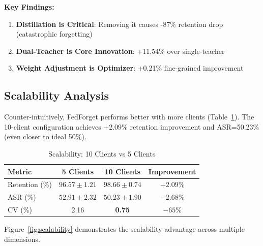 \documentclass[10pt,twocolumn]{article}
\begin{document}
\textbf{Key Findings:}

\begin{enumerate}
\item \textbf{Distillation is Critical}: Removing it causes -87\% retention drop (catastrophic forgetting)
\item \textbf{Dual-Teacher is Core Innovation}: +11.54\% over single-teacher
\item \textbf{Weight Adjustment is Optimizer}: +0.21\% fine-grained improvement
\end{enumerate}

\subsection{Scalability Analysis}

Counter-intuitively, FedForget performs better with more clients (Table~\ref{tab:scalability}). The 10-client configuration achieves +2.09\% retention improvement and ASR=50.23\% (even closer to ideal 50\%).

\begin{table}[t]
\centering
\caption{Scalability: 10 Clients vs 5 Clients}
\label{tab:scalability}
\begin{tabular}{lccc}
\toprule
Metric & 5 Clients & 10 Clients & Improvement \\
\midrule
Retention (\%) & $96.57 \pm 1.21$ & $\mathbf{98.66 \pm 0.74}$ & $+2.09$\% \\
ASR (\%) & $52.91 \pm 2.32$ & $\mathbf{50.23 \pm 1.90}$ & $-2.68$\% \\
CV (\%) & 2.16 & \textbf{0.75} & $-65$\% \\
\bottomrule
\end{tabular}
\end{table}

Figure~\ref{fig:scalability} demonstrates the scalability advantage across multiple dimensions.
\end{document}
